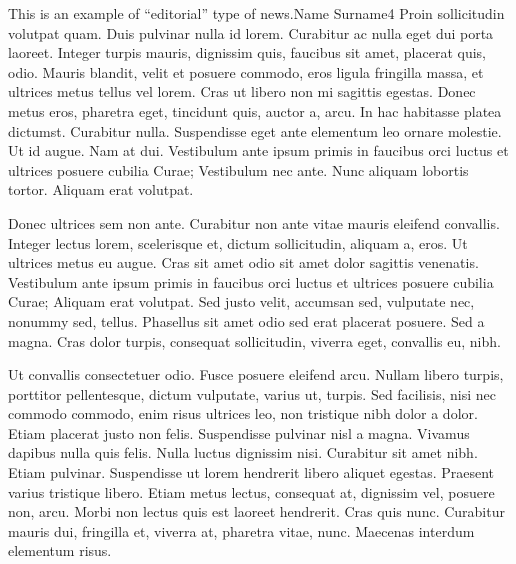 \documentclass[10pt,final,hyphenatedtitles]{papertex}
\begin{document}
\begin{editorial}{1}{This is an example of ``editorial'' type of news.}{Name Surname}{4}
Proin sollicitudin volutpat quam. Duis pulvinar nulla id lorem. Curabitur ac nulla eget dui porta laoreet. Integer turpis mauris, dignissim quis, faucibus sit amet, placerat quis, odio. Mauris blandit, velit et posuere commodo, eros ligula fringilla massa, et ultrices metus tellus vel lorem. Cras ut libero non mi sagittis egestas. Donec metus eros, pharetra eget, tincidunt quis, auctor a, arcu. In hac habitasse platea dictumst. Curabitur nulla. Suspendisse eget ante elementum leo ornare molestie. Ut id augue. Nam at dui. Vestibulum ante ipsum primis in faucibus orci luctus et ultrices posuere cubilia Curae; Vestibulum nec ante. Nunc aliquam lobortis tortor. Aliquam erat volutpat.

Donec ultrices sem non ante. Curabitur non ante vitae mauris eleifend convallis. Integer lectus lorem, scelerisque et, dictum sollicitudin, aliquam a, eros. Ut ultrices metus eu augue. Cras sit amet odio sit amet dolor sagittis venenatis. Vestibulum ante ipsum primis in faucibus orci luctus et ultrices posuere cubilia Curae; Aliquam erat volutpat. Sed justo velit, accumsan sed, vulputate nec, nonummy sed, tellus. Phasellus sit amet odio sed erat placerat posuere. Sed a magna. Cras dolor turpis, consequat sollicitudin, viverra eget, convallis eu, nibh.

Ut convallis consectetuer odio. Fusce posuere eleifend arcu. Nullam libero turpis, porttitor pellentesque, dictum vulputate, varius ut, turpis. Sed facilisis, nisi nec commodo commodo, enim risus ultrices leo, non tristique nibh dolor a dolor. Etiam placerat justo non felis. Suspendisse pulvinar nisl a magna. Vivamus dapibus nulla quis felis. Nulla luctus dignissim nisi. Curabitur sit amet nibh. Etiam pulvinar. Suspendisse ut lorem hendrerit libero aliquet egestas. Praesent varius tristique libero. Etiam metus lectus, consequat at, dignissim vel, posuere non, arcu. Morbi non lectus quis est laoreet hendrerit. Cras quis nunc. Curabitur mauris dui, fringilla et, viverra at, pharetra vitae, nunc. Maecenas interdum elementum risus.
\end{editorial}

\newssep
\end{document}
